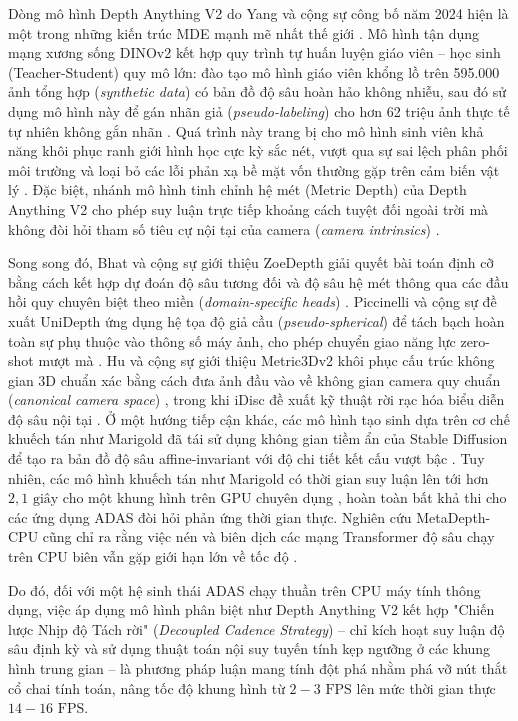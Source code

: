 \documentclass[12pt,a4paper]{article}
\begin{document}
Dòng mô hình Depth Anything V2 do Yang và cộng sự công bố năm 2024 hiện là một trong những kiến trúc MDE mạnh mẽ nhất thế giới \cite{17, 18}. Mô hình tận dụng mạng xương sống DINOv2 kết hợp quy trình tự huấn luyện giáo viên -- học sinh (Teacher-Student) quy mô lớn: đào tạo mô hình giáo viên khổng lồ trên 595.000 ảnh tổng hợp (\textit{synthetic data}) có bản đồ độ sâu hoàn hảo không nhiễu, sau đó sử dụng mô hình này để gán nhãn giả (\textit{pseudo-labeling}) cho hơn 62 triệu ảnh thực tế tự nhiên không gắn nhãn \cite{18}. Quá trình này trang bị cho mô hình sinh viên khả năng khôi phục ranh giới hình học cực kỳ sắc nét, vượt qua sự sai lệch phân phối môi trường và loại bỏ các lỗi phản xạ bề mặt vốn thường gặp trên cảm biến vật lý \cite{17}. Đặc biệt, nhánh mô hình tinh chỉnh hệ mét (Metric Depth) của Depth Anything V2 cho phép suy luận trực tiếp khoảng cách tuyệt đối ngoài trời mà không đòi hỏi tham số tiêu cự nội tại của camera (\textit{camera intrinsics}) \cite{17}.

Song song đó, Bhat và cộng sự giới thiệu ZoeDepth giải quyết bài toán định cỡ bằng cách kết hợp dự đoán độ sâu tương đối và độ sâu hệ mét thông qua các đầu hồi quy chuyên biệt theo miền (\textit{domain-specific heads}) \cite{19}. Piccinelli và cộng sự đề xuất UniDepth ứng dụng hệ tọa độ giả cầu (\textit{pseudo-spherical}) để tách bạch hoàn toàn sự phụ thuộc vào thông số máy ảnh, cho phép chuyển giao năng lực zero-shot mượt mà \cite{20}. Hu và cộng sự giới thiệu Metric3Dv2 khôi phục cấu trúc không gian 3D chuẩn xác bằng cách đưa ảnh đầu vào về không gian camera quy chuẩn (\textit{canonical camera space}) \cite{21}, trong khi iDisc đề xuất kỹ thuật rời rạc hóa biểu diễn độ sâu nội tại \cite{28}. Ở một hướng tiếp cận khác, các mô hình tạo sinh dựa trên cơ chế khuếch tán như Marigold đã tái sử dụng không gian tiềm ẩn của Stable Diffusion để tạo ra bản đồ độ sâu affine-invariant với độ chi tiết kết cấu vượt bậc \cite{22}. Tuy nhiên, các mô hình khuếch tán như Marigold có thời gian suy luận lên tới hơn $2,1\text{ giây}$ cho một khung hình trên GPU chuyên dụng \cite{22}, hoàn toàn bất khả thi cho các ứng dụng ADAS đòi hỏi phản ứng thời gian thực. Nghiên cứu MetaDepth-CPU cũng chỉ ra rằng việc nén và biên dịch các mạng Transformer độ sâu chạy trên CPU biên vẫn gặp giới hạn lớn về tốc độ \cite{23}.

Do đó, đối với một hệ sinh thái ADAS chạy thuần trên CPU máy tính thông dụng, việc áp dụng mô hình phân biệt như Depth Anything V2 kết hợp "Chiến lược Nhịp độ Tách rời" (\textit{Decoupled Cadence Strategy}) -- chỉ kích hoạt suy luận độ sâu định kỳ và sử dụng thuật toán nội suy tuyến tính kẹp ngưỡng ở các khung hình trung gian -- là phương pháp luận mang tính đột phá nhằm phá vỡ nút thắt cổ chai tính toán, nâng tốc độ khung hình từ $2-3\text{ FPS}$ lên mức thời gian thực $14-16\text{ FPS}$.
\end{document}
